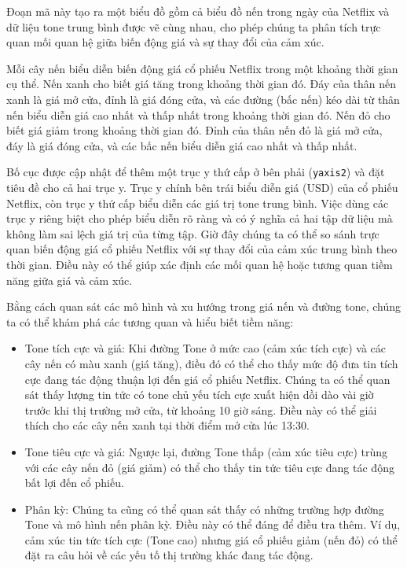 Đoạn mã này tạo ra một biểu đồ gồm cả biểu đồ nến trong ngày của Netflix và dữ liệu tone trung bình được vẽ cùng nhau, cho phép chúng ta phân tích trực quan mối quan hệ giữa biến động giá và sự thay đổi của cảm xúc.

Mỗi cây nến biểu diễn biến động giá cổ phiếu Netflix trong một khoảng thời gian cụ thể. Nến xanh cho biết giá tăng trong khoảng thời gian đó. Đáy của thân nến xanh là giá mở cửa, đỉnh là giá đóng cửa, và các đường (bấc nến) kéo dài từ thân nến biểu diễn giá cao nhất và thấp nhất trong khoảng thời gian đó. Nến đỏ cho biết giá giảm trong khoảng thời gian đó. Đỉnh của thân nến đỏ là giá mở cửa, đáy là giá đóng cửa, và các bấc nến biểu diễn giá cao nhất và thấp nhất.

Bố cục được cập nhật để thêm một trục y thứ cấp ở bên phải (\texttt{yaxis2}) và đặt tiêu đề cho cả hai trục y. Trục y chính bên trái biểu diễn giá (USD) của cổ phiếu Netflix, còn trục y thứ cấp biểu diễn các giá trị tone trung bình. Việc dùng các trục y riêng biệt cho phép biểu diễn rõ ràng và có ý nghĩa cả hai tập dữ liệu mà không làm sai lệch giá trị của từng tập. Giờ đây chúng ta có thể so sánh trực quan biến động giá cổ phiếu Netflix với sự thay đổi của cảm xúc trung bình theo thời gian. Điều này có thể giúp xác định các mối quan hệ hoặc tương quan tiềm năng giữa giá và cảm xúc.

Bằng cách quan sát các mô hình và xu hướng trong giá nến và đường tone, chúng ta có thể khám phá các tương quan và hiểu biết tiềm năng:

\begin{itemize}
\item
  Tone tích cực và giá: Khi đường Tone ở mức cao (cảm xúc tích cực) và các cây nến có màu xanh (giá tăng), điều đó có thể cho thấy mức độ đưa tin tích cực đang tác động thuận lợi đến giá cổ phiếu Netflix. Chúng ta có thể quan sát thấy lượng tin tức có tone chủ yếu tích cực xuất hiện dồi dào vài giờ trước khi thị trường mở cửa, từ khoảng 10 giờ sáng. Điều này có thể giải thích cho các cây nến xanh tại thời điểm mở cửa lúc 13:30.
\item
  Tone tiêu cực và giá: Ngược lại, đường Tone thấp (cảm xúc tiêu cực) trùng với các cây nến đỏ (giá giảm) có thể cho thấy tin tức tiêu cực đang tác động bất lợi đến cổ phiếu.
\item
  Phân kỳ: Chúng ta cũng có thể quan sát thấy có những trường hợp đường Tone và mô hình nến phân kỳ. Điều này có thể đáng để điều tra thêm. Ví dụ, cảm xúc tin tức tích cực (Tone cao) nhưng giá cổ phiếu giảm (nến đỏ) có thể đặt ra câu hỏi về các yếu tố thị trường khác đang tác động.
\end{itemize}

